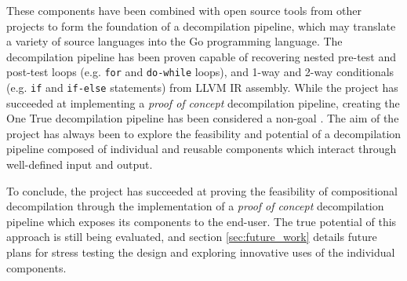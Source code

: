 These components have been combined with open source tools from other projects to form the foundation of a decompilation pipeline, which may translate a variety of source languages into the Go programming language. The decompilation pipeline has been proven capable of recovering nested pre-test and post-test loops (e.g. \texttt{for} and \texttt{do-while} loops), and 1-way and 2-way conditionals (e.g. \texttt{if} and \texttt{if-else} statements) from LLVM IR assembly. While the project has succeeded at implementing a \textit{proof of concept} decompilation pipeline, creating the One True decompilation pipeline has been considered a non-goal \cite{non-goals}. The aim of the project has always been to explore the feasibility and potential of a decompilation pipeline composed of individual and reusable components which interact through well-defined input and output.

To conclude, the project has succeeded at proving the feasibility of compositional decompilation through the implementation of a \textit{proof of concept} decompilation pipeline which exposes its components to the end-user. The true potential of this approach is still being evaluated, and section \ref{sec:future_work} details future plans for stress testing the design and exploring innovative uses of the individual components.
